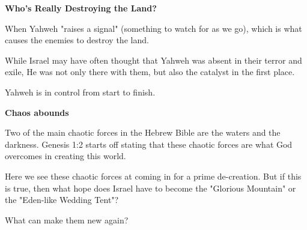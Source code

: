 \documentclass[11pt]{article}
\begin{document}
\newpage
{\large\bfseries Who's Really Destroying the Land?}
\vspace{1em}

When Yahweh "raises a signal" (something to watch for as we go), which is what causes the enemies to destroy the land.

While Israel may have often thought that Yahweh was absent in their terror and exile, He was not only there with them, but also the catalyst in the first place.

{\vspace{1em}}
Yahweh is in control from start to finish.

\vspace{3em}
{\large\bfseries Chaos abounds}
\vspace{1em}

Two of the main chaotic forces in the Hebrew Bible are the waters and the darkness. Genesis 1:2 starts off stating that these chaotic forces are what God overcomes in creating this world.

Here we see these chaotic forces at coming in for a prime de-creation. But if this is true, then what hope does Israel have to become the "Glorious Mountain" or the "Eden-like Wedding Tent"?

{\vspace{1em}}
What can make them new again?
\end{document}
